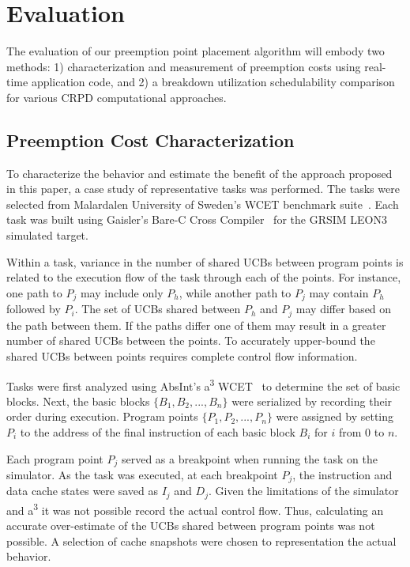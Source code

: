 \vspace{-10pt}
\section{Evaluation}\label{sec:evaluation}
The evaluation of our preemption point placement algorithm will embody
two methods: 1) characterization and measurement of preemption costs
using real-time application code, and 2) a breakdown utilization schedulability
comparison for various CRPD computational approaches.
\subsection {Preemption Cost
  Characterization}\label{sec:preemption_cost_measurement}
To characterize the behavior and estimate the benefit of the approach
proposed in this paper, a case study of representative tasks was
performed. The tasks were selected from Malardalen University of
Sweden's WCET benchmark suite~\cite{mrtc:01}. Each task was built using Gaisler's
Bare-C Cross Compiler~\cite{gaisler:01} for the GRSIM
LEON3~\cite{gaisler:02} simulated target.

Within a task, variance in the number of shared UCBs between program
points is related to the execution flow of the task through each of
the points. For instance, one path to ${P_j}$ may include only ${P_h}$,
while another path to ${P_j}$ may contain ${P_h}$ followed by
${P_i}$. The set of UCBs shared between ${P_h}$ and ${P_j}$ may differ
based on the path between them. If the paths differ one of them may
result in a greater number of shared UCBs between the points. To
accurately upper-bound the shared UCBs between points requires
complete control flow information.

Tasks were first analyzed using AbsInt's a\textsuperscript{3} WCET~\cite{absint:01}
to determine the set of basic blocks. Next, the basic
blocks ${\{B_1, B_2, ..., B_n\}}$ were serialized by recording their
order during execution. Program points ${\{P_1, P_2, ..., P_n\}}$ were
assigned by setting ${P_i}$ to the address of the final instruction of
each basic block ${B_i}$ for ${i}$ from ${0}$ to ${n}$.

Each program point ${P_j}$ served as a breakpoint when running the
task on the simulator. As the task was executed, at each breakpoint
${P_j}$, the instruction and data cache states were saved as ${I_j}$
and ${D_j}$. Given the limitations of the simulator and
a\textsuperscript{3} it was not possible record the actual control
flow. Thus, calculating an accurate over-estimate of the UCBs shared
between program points was not possible. A selection of cache
snapshots were chosen to representation the actual behavior.

